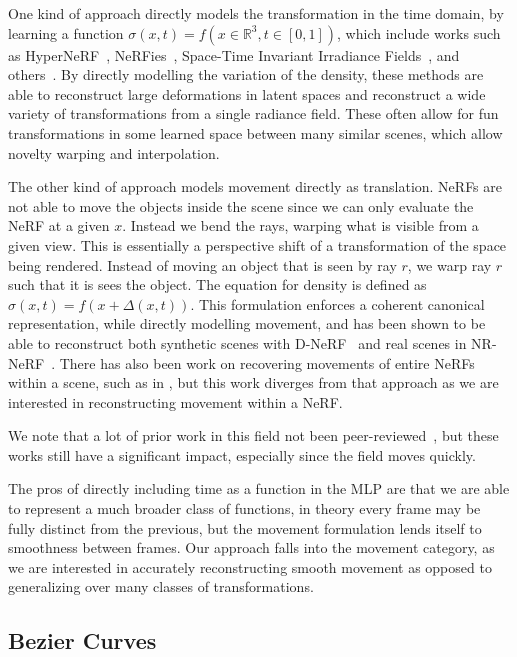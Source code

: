 One kind of approach directly models the transformation in the time domain, by learning a function $\sigma(x,t)=f(x\in\mathbb{R}^3, t\in[0,1])$, which include works such as HyperNeRF~\cite{park2021hypernerf}, NeRFies~\cite{park2021nerfies}, Space-Time Invariant Irradiance Fields~\cite{xian2021space}, and others~\cite{Wang_2021_CVPR,du2021nerflow}. By directly modelling the variation of the density, these methods are able to reconstruct large deformations in latent spaces and reconstruct a wide variety of transformations from a single radiance field. These often allow for fun transformations in some learned space between many similar scenes, which allow novelty warping and interpolation.

The other kind of approach models movement directly as translation. NeRFs are not able to move the objects inside the scene since we can only evaluate the NeRF at a given $x$. Instead we bend the rays, warping what is visible from a given view. This is essentially a perspective shift of a transformation of the space being rendered. Instead of moving an object that is seen by ray $r$, we warp ray $r$ such that it is sees the object. The equation for density is defined as $\sigma(x,t)=f(x+\Delta(x,t))$. This formulation enforces a coherent canonical representation, while directly modelling movement, and has been shown to be able to reconstruct both synthetic scenes with D-NeRF~\cite{pumarola2020dnerf} and real scenes in NR-NeRF~\cite{tretschk2021nonrigid}. There has also been work on recovering movements of entire NeRFs within a scene, such as in \cite{dynamicSceneGraphs}, but this work diverges from that approach as we are interested in reconstructing movement within a NeRF.

We note that a lot of prior work in this field not been peer-reviewed~\cite{pumarola2020dnerf,li2021neural,park2021nerfies,neural3dViewSynthesis}, but these works still have a significant impact, especially since the field moves quickly.

The pros of directly including time as a function in the MLP are that we are able to represent a much broader class of functions, in theory every frame may be fully distinct from the previous, but the movement formulation lends itself to smoothness between frames. Our approach falls into the movement category, as we are interested in accurately reconstructing smooth movement as opposed to generalizing over many classes of transformations.

\subsection*{Bezier Curves}

